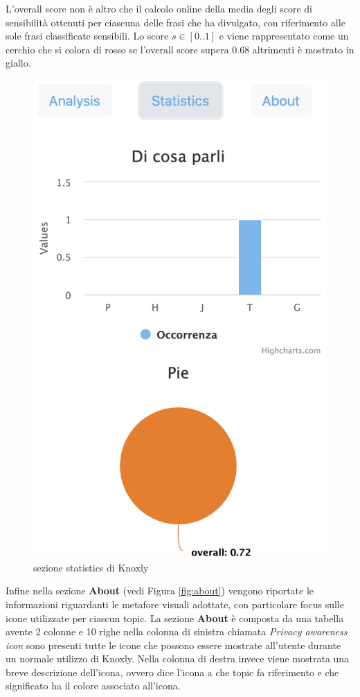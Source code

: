 L'overall score non è altro che il calcolo online della media degli score di sensibilità ottenuti per ciascuna delle frasi che ha divulgato, con riferimento alle sole frasi classificate sensibili. Lo score $s \in [0..1]$ e viene rappresentato come un cerchio che si colora di rosso se l'overall score supera 0.68 altrimenti è mostrato in giallo. 
\begin{figure}[h]
    \centering
    \includegraphics[scale=0.5]{Figure/ui/statistics.png}
    \caption{sezione statistics di Knoxly}
    \label{fig:statKnoxly}
\end{figure}
\FloatBarrier

Infine nella sezione \textbf{About} (vedi Figura \ref{fig:about}) vengono riportate le informazioni riguardanti le metafore visuali adottate, con particolare focus sulle icone utilizzate per ciascun topic. La sezione \textbf{About} è composta da una tabella avente 2 colonne e 10 righe nella colonna di sinistra chiamata \textit{Privacy awareness icon} sono presenti tutte le icone che possono essere mostrate all'utente durante un normale utilizzo di Knoxly. Nella colonna di destra invece viene mostrata una breve descrizione dell'icona, ovvero dice l'icona a che topic fa riferimento e che significato ha il colore associato all'icona.

